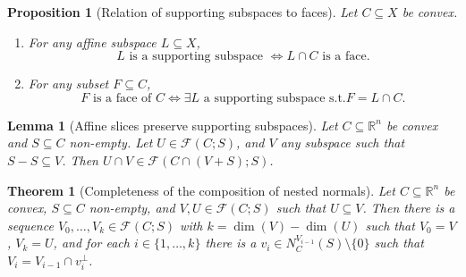 \documentclass[10pt,a4paper]{amsart}
\newtheorem{proposition}{Proposition}
\newtheorem{theorem}{Theorem}
\newtheorem{lemma}{Lemma}
\begin{document}
\begin{proposition}[Relation of supporting subspaces to faces]
\label{loc:relation_of_supporting_subspaces_to_faces.statement}
Let $C \subseteq X$ be convex.
\begin{enumerate}
\item For any affine subspace $L \subseteq X$,
\begin{equation*}
L \text{ is a supporting subspace }  \iff L \cap C \text{ is a face.}
\end{equation*}
\item For any subset $F \subseteq C$,
\begin{equation*}
F \text{ is a face of }C  \iff \exists L \text{ a supporting subspace s.t.} F = L \cap C.
\end{equation*}
\end{enumerate}
\end{proposition}

\begin{lemma}[Affine slices preserve supporting subspaces]
\label{loc:affine_slices_preserve_supporting_subspaces.statement}
Let $C \subseteq \mathbb{R}^n$ be convex and $S \subseteq C$ non-empty.
Let $U \in \mathcal{F}(C;S)$, and $V$ any subspace such that
$S-S \subseteq V$. Then $U \cap V \in \mathcal{F}(C \cap (V+S);S)$.
\end{lemma}

\begin{theorem}[Completeness of the composition of nested normals]
\label{loc:completeness_of_the_composition_of_nested_normals.statement}
Let $C \subseteq \mathbb{R}^n$ be convex, $S \subseteq C$ non-empty,
and $V, U \in \mathcal{F}(C;S)$ such that $U \subseteq V$.
Then there is a sequence $V_0, \ldots, V_k \in \mathcal{F}(C;S)$ 
with $k= \dim(V)-\dim(U)$ such that $V_0=V$, $V_k=U$, and for each
$i \in \{ 1, \ldots,k\}$ there is a $v_i \in N_C^{V_{i-1}}(S) \setminus \{0\}$ such that $V_i = V_{i-1} \cap v_i^\perp$.
\end{theorem}
\end{document}
